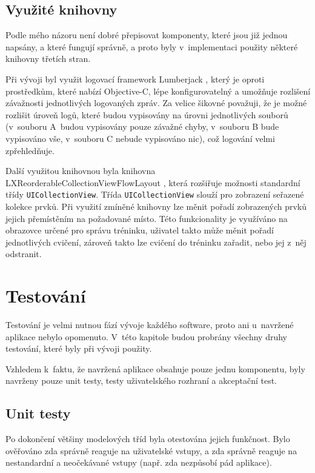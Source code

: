 \documentclass[thesis=B,czech]{FITthesis}[2012/06/26]
\begin{document}
	\section{Využité knihovny}

	Podle mého názoru není dobré přepisovat komponenty, které jsou již jednou napsány, a které fungují správně, a proto byly v~implementaci použity některé knihovny třetích stran.

	Při vývoji byl využit logovací framework Lumberjack \cite{lumberjackOnline}, který je oproti prostředkům, které nabízí Objective-C, lépe konfigurovatelný a umožňuje rozlišení závažnosti jednotlivých logovaných zpráv. Za velice šikovné považuji, že je možné rozlišit úroveň logů, které budou vypisovány na úrovni jednotlivých souborů (v~souboru A~budou vypisovány pouze závažné chyby, v~souboru B bude vypisováno vše, v~souboru C nebude vypisováno nic), což logování velmi zpřehledňuje.

	Další využitou knihovnou byla knihovna LXReorderableCollectionViewFlowLayout \cite{reorderableCollectionViewOnline}, která rozšiřuje možnosti standardní třídy \verb|UICollectionView|. Třída \verb|UICollectionView| slouží pro zobrazení seřazené kolekce prvků. Při využití zmíněné knihovny lze měnit pořadí zobrazených prvků jejich přemístěním na požadované místo. Této funkcionality je využíváno na obrazovce určené pro správu tréninku, uživatel takto může měnit pořadí jednotlivých cvičení, zároveň takto lze cvičení do tréninku zařadit, nebo jej z~něj odstranit.

\chapter{Testování}

	Testování je velmi nutnou fází vývoje každého software, proto ani u~navržené aplikace nebylo opomenuto. V~této kapitole budou probrány všechny druhy testování, které byly při vývoji použity.

	Vzhledem k~faktu, že navržená aplikace obsahuje pouze jednu komponentu, byly navrženy pouze unit testy, testy uživatelského rozhraní a akceptační test.

\section{Unit testy}

	Po dokončení většiny modelových tříd byla otestována jejich funkčnost. Bylo ověřováno zda správně reaguje na uživatelské vstupy, a zda správně reaguje na nestandardní a neočekávané vstupy (např. zda nezpůsobí pád aplikace).
\end{document}
